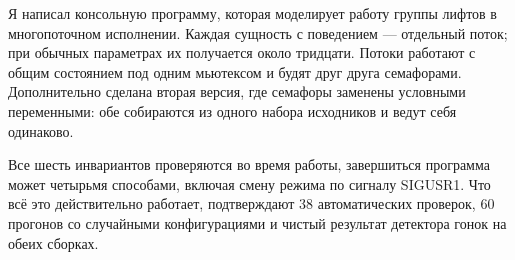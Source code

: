 \documentclass[12pt,a4paper]{article}
\begin{document}
Я написал консольную программу, которая моделирует работу группы лифтов в
многопоточном исполнении. Каждая сущность с поведением --- отдельный
поток; при обычных параметрах их получается около тридцати. Потоки
работают с общим состоянием под одним мьютексом и будят друг друга
семафорами. Дополнительно сделана вторая версия, где семафоры заменены
условными переменными: обе собираются из одного набора исходников и
ведут себя одинаково.

Все шесть инвариантов проверяются во время работы, завершиться программа
может четырьмя способами, включая смену режима по сигналу SIGUSR1. Что всё
это действительно работает, подтверждают 38 автоматических проверок,
60 прогонов со случайными конфигурациями и чистый результат детектора
гонок на обеих сборках.
\end{document}
